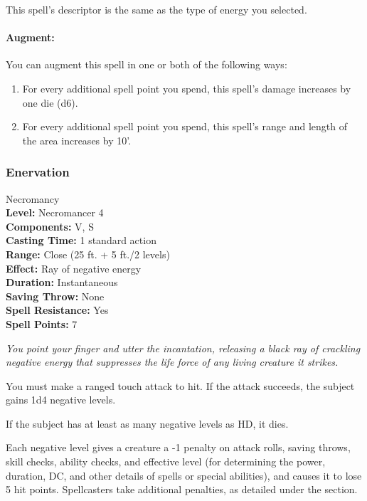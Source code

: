 This spell's descriptor is the same as the type of energy you selected.

\paragraph{Augment:} You can augment this spell in one or both of the following ways:
\begin{enumerate}
 \item For every additional spell point you spend, this spell's damage increases by one die (d6).
 \item For every additional spell point you spend, this spell's range and length of the area increases by 10'.
\end{enumerate}

\subsubsection{Enervation}
\label{Spell:Enervation}
Necromancy
\\ \textbf{Level:} Necromancer 4
\\ \textbf{Components:} V, S
\\ \textbf{Casting Time:} 1 standard action
\\ \textbf{Range:} Close (25 ft. + 5 ft./2 levels)
\\ \textbf{Effect:} Ray of negative energy
\\ \textbf{Duration:} Instantaneous
\\ \textbf{Saving Throw:} None
\\ \textbf{Spell Resistance:} Yes
\\ \textbf{Spell Points:} 7

\emph{You point your finger and utter the incantation, releasing a black ray of crackling negative energy that suppresses the life force of any living creature it strikes.} 

You must make a ranged touch attack to hit.
If the attack succeeds, the subject gains 1d4 negative levels.

If the subject has at least as many negative levels as HD, it dies. 

Each negative level gives a creature a -1 penalty on attack rolls, saving throws, 
skill checks, ability checks, and effective level (for determining the power, duration, DC, and other details of spells or special abilities), 
and causes it to lose 5 hit points.
Spellcasters take additional penalties, as detailed under the  section.

